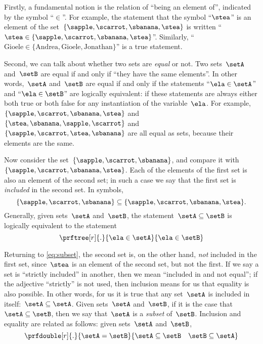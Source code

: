 
Firstly, a fundamental notion is the relation of ``being an element of'', indicated by the symbol ``$\in$''.
For example, the statement that the symbol ``$\stea$'' is an element of the set~$\{ \sapple, \scarrot, \sbanana, \stea \}$ is written ``$\stea \in \{ \sapple, \scarrot, \sbanana, \stea \}$''.
Similarly, ``$\text{Gioele} \in \{ \text{Andrea}, \text{Gioele}, \text{Jonathan} \}$'' is a true statement.

Second, we can talk about whether two sets are \emph{equal} or not.
Two sets~$\setA$ and~$\setB$ are equal if and only if ``they have the same elements''.
In other words,~$\setA$ and~$\setB$ are equal if and only if the statements
``$\ela \in \setA$'' and ``$\ela \in \setB$'' are logically equivalent:
if these statements are always either both true or both false for any instantiation of the variable~$\ela$.
For example, $\{ \sapple, \scarrot, \sbanana, \stea \}$ and~$\{ \stea, \sbanana, \sapple, \scarrot\}$ and~$\{ \sapple, \scarrot, \stea, \sbanana \}$ are all equal as sets, because their elements are the same.

Now consider the set~$\{ \sapple, \scarrot, \sbanana \}$, and compare it with~$\{ \sapple, \scarrot, \sbanana, \stea \}$.
Each of the elements of the first set is also an element of the second set;
in such a case we say that the first set is \emph{included} in the second set.
In symbols,
%
\begin{equation}
	\label{eq:subset}
	\{ \sapple, \scarrot, \sbanana \} \subseteq \{ \sapple, \scarrot, \sbanana, \stea \}.
\end{equation}
%
Generally, given sets~$\setA$ and~$\setB$, the statement~$\setA \subseteq \setB$ is logically equivalent to the statement
%
\begin{equation*}
	\prftree[r]{.}{\ela \in \setA}{\ela \in \setB}
\end{equation*}

Returning to \cref{eq:subset}, the second set is, on the other hand, \emph{not} included in the first set, since~$\stea$ is an element of the second set, but not the first.
If we say a set is ``strictly included'' in another, then we mean ``included in and not equal'';
if the adjective ``strictly'' is not used, then inclusion means for us that equality is also possible.
In other words, for us it is true that any set~$\setA$ is included in itself:~$\setA \subseteq \setA$.
Given sets~$\setA$ and~$\setB$, if it is the case that~$\setA \subseteq \setB$, then we say that~$\setA$ is a \emph{subset} of~$\setB$.
Inclusion and equality are related as follows: given sets~$\setA$ and~$\setB$,
\begin{equation*}
	\prfdouble[r]{.}{\setA = \setB}{{\setA \subseteq \setB}\quad{\setB \subseteq \setA}}
\end{equation*}

